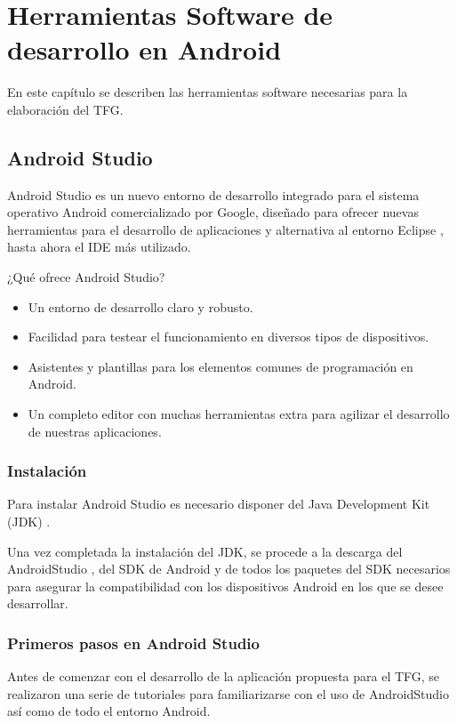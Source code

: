 %
%
%
%

\cleardoublepage
\chapter{Herramientas Software de desarrollo en Android} \label{chap:polytopes}  

En este capítulo se describen las herramientas software necesarias para la elaboración del TFG.

\section{Android Studio}

Android Studio \cite{URL::AndroidStudio} es un nuevo entorno de desarrollo integrado para el sistema operativo Android comercializado por Google, 
diseñado para ofrecer nuevas herramientas para el desarrollo de aplicaciones y alternativa al entorno Eclipse \cite{URL::Eclipse}, 
hasta ahora el IDE más utilizado.

¿Qué ofrece Android Studio? 
\begin{itemize}
\item Un entorno de desarrollo claro y robusto.
\item Facilidad para testear el funcionamiento en diversos tipos de dispositivos.
\item Asistentes y plantillas para los elementos comunes de programación en Android.
\item Un completo editor con muchas herramientas extra para agilizar el desarrollo de nuestras aplicaciones.
\end{itemize}

\subsection{Instalación}
Para instalar Android Studio es necesario disponer del Java Development Kit (JDK) \cite{URL::JDKInfo}. 

Una vez completada la instalación del JDK, se procede a la descarga del AndroidStudio \cite{URL::AndroidStudio}, del SDK de Android
\cite{URL::InstallSDK} y de todos los paquetes del SDK \cite{URL::SDKPackages} necesarios para asegurar la compatibilidad con los dispositivos Android en
los que se desee desarrollar.

\subsection{Primeros pasos en Android Studio}

Antes de comenzar con el desarrollo de la aplicación propuesta para el TFG, se realizaron una serie de tutoriales \cite{URL::GettingStarted, URL::SavingData} para familiarizarse con el uso de AndroidStudio así como de todo el entorno Android.


